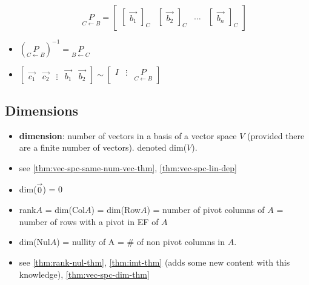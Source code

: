 \documentclass[a4paper,12pt]{article}
\theoremstyle{definition}
\theoremstyle{definition}
\newcommand{\basiscoord}[2]{
	\begin{bmatrix}
		\vec{#1}
	\end{bmatrix}_#2
}
\newcommand{\chngbasismat}[2]{
	\underset{#2 \leftarrow #1}{P}
}
\begin{document}
\begin{itemize}
		\begin{equation*}
			\chngbasismat{B}{C}
			=
			\begin{bmatrix}
				\basiscoord{b_1}{C} & \basiscoord{b_2}{C} & \ldots & \basiscoord{b_n}{C}
			\end{bmatrix}
		\end{equation*}
		
		\item $(\chngbasismat{B}{C})^{-1} = \chngbasismat{C}{B}$
		
		\item $\begin{bmatrix}
			\vec{c_1} & \vec{c_2} & \vdots & \vec{b_1} & \vec{b_2}
		\end{bmatrix}
		\sim
		\begin{bmatrix}
			I & \vdots & \chngbasismat{B}{C}
		\end{bmatrix}$
	\end{itemize}
	
	\subsection{Dimensions}
	\begin{itemize}
		\item \textbf{dimension}: number of vectors in a basis of a vector space $V$ (provided there are a finite number of vectors). denoted dim($V$).
		
		\item see \autoref{thm:vec-spc-same-num-vec-thm}, \autoref{thm:vec-spc-lin-dep}
		
		\item dim($\vec{0}$) = 0
		
		\item rank$A$ = dim(Col$A$) = dim(Row$A$) = number of pivot columns of $A$ = number of rows with a pivot in EF of $A$
		
		\item dim(Nul$A$) = nullity of A = \# of non pivot columns in $A$.
		
		\item see \autoref{thm:rank-nul-thm}, \autoref{thm:imt-thm} (adds some new content with this knowledge), \autoref{thm:vec-spc-dim-thm}
	\end{itemize}
	
\end{document}
